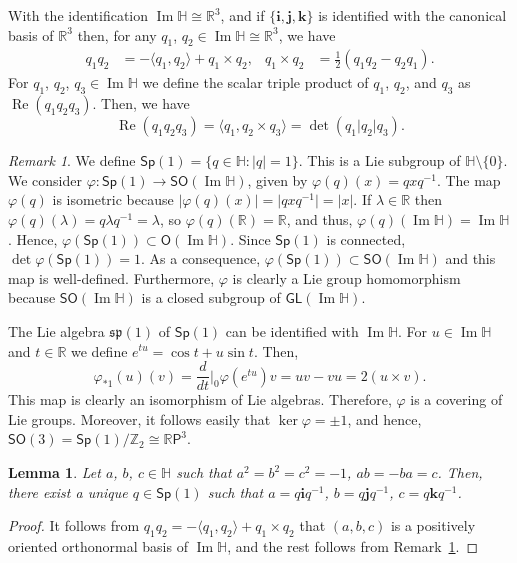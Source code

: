 \documentclass[12pt, a4paper]{amsart}
\newcommand{\g}{\mathfrak}
\newcommand{\R}{\mathbb{R}}
\renewcommand{\H}{\mathbb{H}}
\renewcommand{\Re}{\operatorname{Re}}
\renewcommand{\Im}{\operatorname{Im}}
\newcommand{\Sp}{\mathsf{Sp}}
\newtheorem{lemma}[theorem]{Lemma}
\theoremstyle{remark}
\newtheorem{remark}{Remark}
\begin{document}
With the identification $\Im\H\cong\R^3$, and if $\{\mathbf{i},\mathbf{j},\mathbf{k}\}$ is identified with the canonical basis of $\R^3$ then, for any $q_1$, $q_2\in\Im{\H}\cong\R^3$, we have 
\[
\begin{aligned}
q_1 q_2
&{}=-\langle q_1,q_2\rangle+q_1\times q_2,
&q_1\times q_2
&{}=\frac{1}{2}(q_1q_2-q_2q_1).
\end{aligned}
\]
For $q_1$, $q_2$, $q_3\in\Im\H$ we define the scalar triple product of $q_1$, $q_2$, and $q_3$ as $\Re(q_1q_2q_3)$.
Then, we have
\[
\Re(q_1q_2q_3)=\langle q_1,q_2\times q_3\rangle=\det(q_1\vert q_2\vert q_3).
\]

\begin{remark}\label{remark:Sp1}
We define $\Sp(1)=\{q\in\H:\lvert q\rvert =1\}$.
This is a Lie subgroup of $\H\setminus\{0\}$.
We consider $\varphi\colon\Sp(1)\to\mathsf{SO}(\Im\H)$, given by $\varphi(q)(x)=qxq^{-1}$. 
The map $\varphi(q)$ is isometric because $\lvert\varphi(q)(x)\rvert=\lvert qxq^{-1}\rvert=\lvert x\rvert$. 
If $\lambda\in\R$ then $\varphi(q)(\lambda)=q\lambda q^{-1}=\lambda$, so $\varphi(q)(\R)=\R$, and thus, $\varphi(q)(\Im\H)=\Im\H$. 
Hence, $\varphi(\Sp(1))\subset\mathsf{O}(\Im\H)$.
Since $\Sp(1)$ is connected, $\det\varphi(\Sp(1))=1$. 
As a consequence, $\varphi(\Sp(1))\subset\mathsf{SO}(\Im\H)$ and this map is well-defined.
Furthermore, $\varphi$ is clearly a Lie group homomorphism because $\mathsf{SO}(\Im\H)$ is a closed subgroup of $\mathsf{GL}(\Im\H)$. 

The Lie algebra $\g{sp}(1)$ of $\Sp(1)$ can be identified with $\Im\H$.
For $u\in\Im\H$ and $t\in\R$ we define $e^{tu}=\cos t+u\sin t$.
Then, 
\[
\varphi_{*1}(u)(v)=\frac{d}{dt}\bigg\vert_0\varphi(e^{tu})v=uv-vu=2(u\times v).
\]
This map is clearly an isomorphism of Lie algebras. 
Therefore, $\varphi$ is a covering of Lie groups.
Moreover, it follows easily that $\ker\varphi={\pm 1}$, and hence, $\mathsf{SO}(3)=\Sp(1)/\mathbb{Z}_2\cong\R\mathsf{P}^3$.
\end{remark}

\begin{lemma}\label{lemma:canonical-triple}
Let $a$, $b$, $c\in\H$ such that $a^2=b^2=c^2=-1$, $ab=-ba=c$.
Then, there exist a unique $q\in\Sp(1)$ such that $a=q\mathbf{i}q^{-1}$, $b=q\mathbf{j}q^{-1}$, $c=q\mathbf{k}q^{-1}$.
\end{lemma}

\begin{proof}
It follows from $q_1 q_2=-\langle q_1,q_2\rangle+q_1\times q_2$ that $(a,b,c)$ is a positively oriented orthonormal basis of $\Im\H$, and the rest follows from Remark~\ref{remark:Sp1}.
\end{proof}
\end{document}
